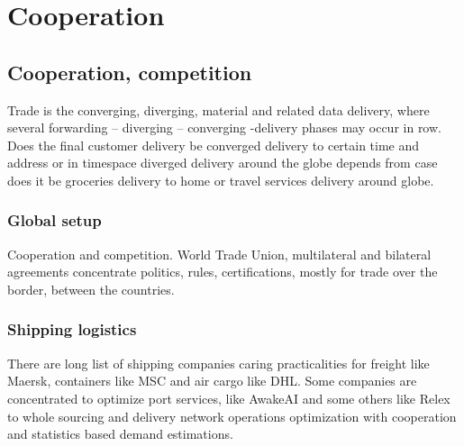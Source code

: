 %
%
%

\part{Cooperation}
\label{cooperation}

\chapter{Cooperation, competition}
\label{cooperation_competition}

Trade is the converging, diverging, material and related data delivery, where
several forwarding -- diverging -- converging -delivery phases may occur in
row. Does the final customer delivery be converged delivery to certain time
and address or in timespace diverged delivery around the globe depends from
case does it be groceries delivery to home or travel services delivery around
globe.

\section{Global setup}
\label{global_setup}
Cooperation and competition.
World Trade Union\cite{WTO}, multilateral\cite{Multilateral} and
bilateral\cite{Bilateral} agreements concentrate politics, rules,
certifications, mostly for trade over the border, between the countries.

\section{Shipping logistics}
\label{shipping_logistics}
There are long list of shipping companies caring practicalities for freight
like Maersk\cite{FreightShipping}, containers like MSC\cite{ContainerShipping}
and air cargo like DHL\cite{CargoAirlines}. Some companies are concentrated to
optimize port services, like AwakeAI\cite{AwakeAI} and some others like
Relex\cite{Relex} to whole sourcing and delivery network operations
optimization with cooperation and statistics based demand estimations.

